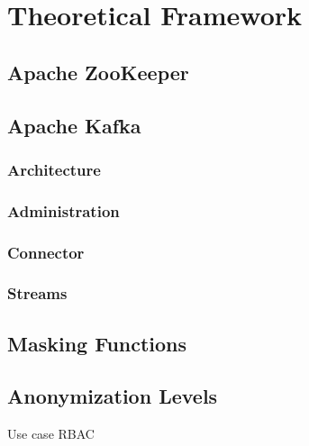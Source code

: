 \chapter{Theoretical Framework\label{cha:chapter3}}

\section{Apache ZooKeeper}

\section{Apache Kafka}
\subsection{Architecture}
\subsection{Administration}
\subsection{Connector}
\subsection{Streams}


\section{Masking Functions}

\section{Anonymization Levels}
Use case
RBAC



    
